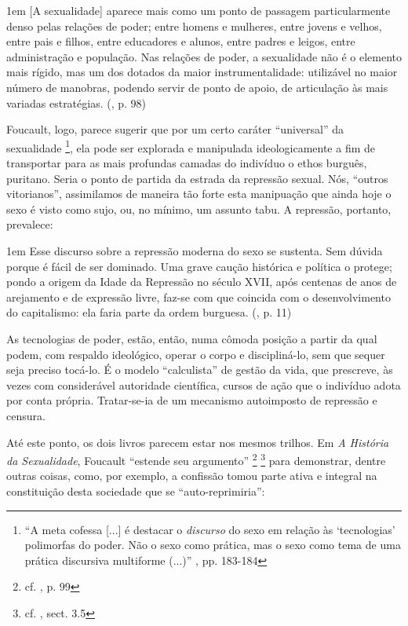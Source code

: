 \documentclass[12pt,a4paper]{article}
\newenvironment{citac}
{
	\begin{addmargin}
		[4cm]{1em} \footnotesize}{\normalfont 
	\end{addmargin}
}
\begin{document}
	\begin{citac}
		[A sexualidade] aparece mais como um ponto de passagem particularmente 
		denso pelas relações de poder; entre homens e mulheres, entre jovens e 
		velhos, entre pais e filhos, entre educadores e alunos, entre padres e 
		leigos, entre administração e população. Nas relações de poder, a 
		sexualidade não é o elemento mais rígido, mas um dos dotados da maior 
		instrumentalidade: utilizável no maior número de manobras, podendo 
		servir de ponto de apoio, de articulação às mais variadas estratégias. 
		(\cite{hs}, p. 98)
	\end{citac}
	
	Foucault, logo, parece sugerir que por um certo caráter ``universal'' da 
	sexualidade
	\footnote{``A meta cofessa [...] é destacar o \textit{discurso} do sexo 
	em relação às `tecnologias' polimorfas do poder. Não o sexo como prática, 
	mas o sexo como tema de uma prática discursiva multiforme (...)'' 
	\cite{merquior}, pp. 183-184}, 
	ela pode ser explorada e manipulada ideologicamente a fim de 
	transportar para as mais profundas camadas do indivíduo o ethos burguês, 
	puritano. Seria o ponto de partida da estrada da repressão sexual. Nós, 
	``outros vitorianos'', assimilamos de maneira tão forte esta manipuação 
	que ainda hoje o sexo é visto como sujo, ou, no mínimo, um assunto tabu. 
	A repressão, portanto, prevalece: 
	
	\begin{citac}
		Esse discurso sobre a repressão moderna do sexo se sustenta. Sem 
		dúvida porque é fácil de ser dominado. Uma grave caução histórica e 
		política o protege; pondo a origem da Idade da Repressão no século 
		XVII, após centenas de anos de arejamento e de expressão livre, 
		faz-se com que coincida com o desenvolvimento do capitalismo: ela 
		faria parte da ordem burguesa. 
		(\cite{hs}, p. 11)
	\end{citac}
	
	As tecnologias de poder, estão, então, numa cômoda posição a partir da 
	qual podem, com respaldo ideológico, operar o corpo e discipliná-lo, 
	sem que sequer seja preciso tocá-lo. É o modelo ``calculista'' de gestão 
	da vida, que prescreve, às vezes com considerável autoridade científica, 
	cursos de ação que o indivíduo adota por conta própria. Tratar-se-ia de 
	um mecanismo autoimposto de repressão e censura. 
	
	Até este ponto, os dois livros parecem estar nos mesmos trilhos. Em 
	\textit{A História da Sexualidade}, Foucault ``estende seu argumento''
		\footnote{cf. \cite{pwkn}, p. 99} 
		\footnote{cf. \cite{sep}, sect. 3.5}
	para demonstrar, dentre outras coisas, como, por exemplo, a confissão 
	tomou parte ativa e integral na constituição desta sociedade que se 
	``auto-reprimiria'': 
	
\end{document}
